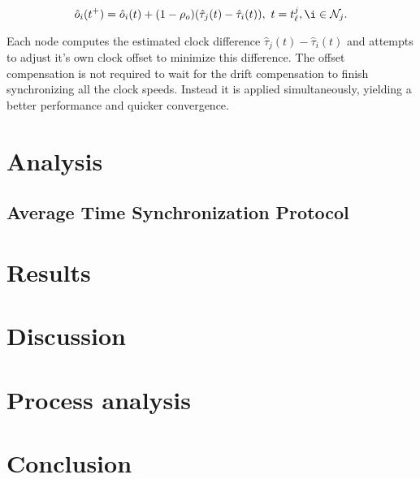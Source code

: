 \documentclass[a4paper,12pt]{article}
\begin{document}
    \begin{equation}
        \hat{o}_i(t^+) = \hat{o}_i(t) + (1 - \rho_o)(\hat{\tau}_j(t) - \hat{\tau}_i(t)), \ t=t^j_\ell, \i \in \mathcal{N}_j.
    \end{equation}
    
    Each node computes the estimated clock difference $\hat\tau_j(t) - \hat\tau_i(t)$ and attempts to adjust it's own clock offset to minimize this difference. The offset compensation is not required to wait for the drift compensation to finish synchronizing all the clock speeds. Instead it is applied simultaneously, yielding a better performance and quicker convergence.  

\section{Analysis}%


\subsection{Average Time Synchronization Protocol}

\section{Results}

\section{Discussion}

\section{Process analysis}%

\section{Conclusion}



\printbibliography
\end{document}
